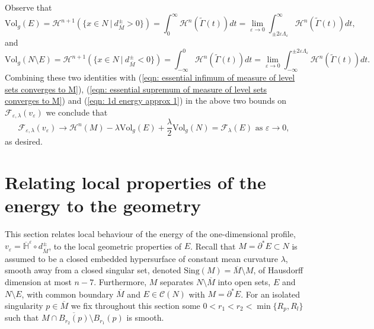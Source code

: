 \documentclass[11pt]{article}
\begin{document}
Observe that
\begin{equation*}
    \mathrm{Vol}_g(E) = \mathcal{H}^{n+1}(\{x \in N \: | \: d^\pm_{\overline{M}} > 0\}) = \int_0^\infty \mathcal{H}^n(\widetilde{\Gamma}(t))dt = \lim_{\varepsilon \rightarrow 0} \int_{\pm 2\varepsilon\Lambda_\varepsilon}^\infty \mathcal{H}^n(\widetilde{\Gamma}(t))dt,
\end{equation*}
and
\begin{equation*}
    \mathrm{Vol}_g(N \setminus E) = \mathcal{H}^{n+1}(\{x \in N \: | \: d^\pm_{\overline{M}} < 0\}) = \int_{-\infty}^0 \mathcal{H}^n(\widetilde{\Gamma}(t))dt = \lim_{\varepsilon \rightarrow 0} \int^{\pm 2\varepsilon\Lambda_\varepsilon}_{-\infty} \mathcal{H}^n(\widetilde{\Gamma}(t))dt.
\end{equation*}
Combining these two identities with (\ref{eqn: essential infimum of measure of level sets converges to M}), (\ref{eqn: essential supremum of measure of level sets converges to M}) and (\ref{eqn: 1d energy approx 1}) in the above two bounds on $\mathcal{F}_{\varepsilon,\lambda}(v_\varepsilon)$ we conclude that
\begin{equation*}
\mathcal{F}_{\varepsilon,\lambda}(v_\varepsilon) \rightarrow \mathcal{H}^n(M) - \lambda \mathrm{Vol}_g(E) + \frac{\lambda}{2}\mathrm{Vol}_g(N) = \mathcal{F}_\lambda(E) \text{ as } \varepsilon \rightarrow 0,
\end{equation*}
as desired.

\section{Relating local properties of the energy to the geometry}\label{sec: local energy properties}

This section relates local behaviour of the energy of the one-dimensional profile, $v_\varepsilon = \overline{\mathbb{H}}^\varepsilon \circ d^\pm_{\overline{M}}$, to the local geometric properties of $E$. Recall that $M = \partial^* E \subset N$ is assumed to be a closed embedded hypersurface of constant mean curvature $\lambda$, smooth away from a closed singular set, denoted $\mathrm{Sing}(M) = \overline{M} \setminus M$, of Hausdorff dimension at most $n - 7$. Furthermore, $M$ separates $N \setminus \overline{M}$ into open sets, $E$ and $N \setminus E$, with common boundary $\overline{M}$ and $E \in \mathcal{C}(N)$ with $M = \partial^* E$. For an isolated singularity $p \in \overline{M}$ we fix throughout this section some $0 < r_1 < r_2 < \min\{R_p,R_l\}$ such that $M \cap \overline{B_{r_2}(p)} \setminus B_{r_1}(p)$ is smooth.
\end{document}
